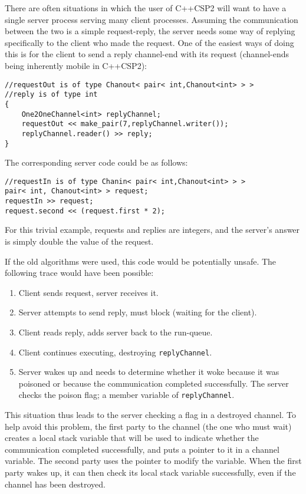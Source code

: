 \documentclass[12pt]{IOS-Book-Article-CPA-2007}
\newcommand{\code}[1]{{\small\texttt{#1}}}
\begin{document}
\label{channel-dest}

There are often situations in which the user of C++CSP2 will want to have a single server process serving many client processes.  Assuming the
communication between the two is a simple request-reply, the server needs some way of replying specifically to the client who made the request.  One 
of the easiest ways of doing this is for the client to send a reply channel-end with its request (channel-ends being inherently mobile in C++CSP2):

{\small\begin{verbatim}
//requestOut is of type Chanout< pair< int,Chanout<int> > >
//reply is of type int
{
    One2OneChannel<int> replyChannel;
    requestOut << make_pair(7,replyChannel.writer());
    replyChannel.reader() >> reply;
}
\end{verbatim}}

The corresponding server code could be as follows:

{\small\begin{verbatim}
//requestIn is of type Chanin< pair< int,Chanout<int> > >
pair< int, Chanout<int> > request;
requestIn >> request;
request.second << (request.first * 2);
\end{verbatim}}

For this trivial example, requests and replies are integers, and the server's answer is simply double the value of the request.

If the old algorithms were used, this code would be potentially unsafe.  The following trace would have been possible:
\begin{enumerate}
\item Client sends request, server receives it.
\item Server attempts to send reply, must block (waiting for the client).
\item Client reads reply, adds server back to the run-queue.
\item Client continues executing, destroying \code{replyChannel}.
\item Server wakes up and needs to determine whether it woke because it was poisoned or because the communication completed successfully.  The server 
checks the poison flag; a member variable of \code{replyChannel}.
\end{enumerate}

This situation thus leads to the server checking a flag in a destroyed channel.  To help avoid this problem, the first party to the channel (the one 
who must wait) creates a local stack variable that will be used to indicate whether the communication completed successfully, and puts a pointer to 
it in a channel variable.  The second party uses the pointer to modify the 
variable.  When the first party wakes up, it can then check its local stack variable successfully, even if the channel has been destroyed.
\end{document}
